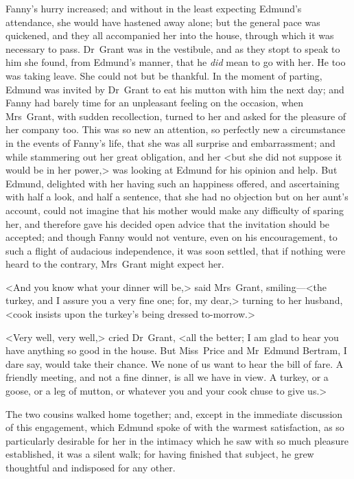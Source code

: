 Fanny's hurry increased; and without in the least expecting Edmund's attendance, she would have hastened away alone; but the general pace was quickened, and they all accompanied her into the house, through which it was necessary to pass. Dr~Grant was in the vestibule, and as they stopt to speak to him she found, from Edmund's manner, that he \textit{did}  mean to go with her. He too was taking leave. She could not but be thankful. In the moment of parting, Edmund was invited by Dr~Grant to eat his mutton with him the next day; and Fanny had barely time for an unpleasant feeling on the occasion, when Mrs~Grant, with sudden recollection, turned to her and asked for the pleasure of her company too. This was so new an attention, so perfectly new a circumstance in the events of Fanny's life, that she was all surprise and embarrassment; and while stammering out her great obligation, and her <but she did not suppose it would be in her power,> was looking at Edmund for his opinion and help. But Edmund, delighted with her having such an happiness offered, and ascertaining with half a look, and half a sentence, that she had no objection but on her aunt's account, could not imagine that his mother would make any difficulty of sparing her, and therefore gave his decided open advice that the invitation should be accepted; and though Fanny would not venture, even on his encouragement, to such a flight of audacious independence, it was soon settled, that if nothing were heard to the contrary, Mrs~Grant might expect her.

<And you know what your dinner will be,> said Mrs~Grant, smiling—<the turkey, and I assure you a very fine one; for, my dear,> turning to her husband, <cook insists upon the turkey's being dressed to-morrow.>

<Very well, very well,> cried Dr~Grant, <all the better; I am glad to hear you have anything so good in the house. But Miss~Price and Mr~Edmund Bertram, I dare say, would take their chance. We none of us want to hear the bill of fare. A friendly meeting, and not a fine dinner, is all we have in view. A turkey, or a goose, or a leg of mutton, or whatever you and your cook chuse to give us.>

The two cousins walked home together; and, except in the immediate discussion of this engagement, which Edmund spoke of with the warmest satisfaction, as so particularly desirable for her in the intimacy which he saw with so much pleasure established, it was a silent walk; for having finished that subject, he grew thoughtful and indisposed for any other. 